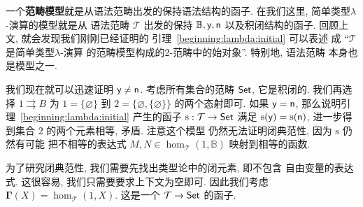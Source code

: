 一个\textbf{范畴模型}就是从语法范畴出发的保持语法结构的函子.
在我们这里, 简单类型\(\lambda\)-演算的模型就是从
语法范畴 \(\mathcal T\) 出发的保持
\(\mathbb B,\textsf{y},\textsf{n}\)
以及积闭结构的函子. 回顾上文, 就会发现我们刚刚已经证明的
引理~\ref{beginning:lambda:initial} 可以表述
成 “\(\mathcal T\) 是简单类型\(\lambda\)-演算
的范畴模型构成的2-范畴中的始对象”. 特别地, 语法范畴
本身也是模型之一.

我们现在就可以迅速证明 \(\textsf{y}\ne\textsf{n}\).
考虑所有集合的范畴 \(\textsf{Set}\), 它是积闭的.
我们再选择 \(1 \rightrightarrows B\) 为
\(1=\{\varnothing\}\) 到
\(2=\{\varnothing, \{\varnothing\}\}\) 的两个态射即可.
如果 \(\textsf{y}=\textsf{n}\),
那么说明引理~\ref{beginning:lambda:initial} 产生的函子
\(\mathrm s:\mathcal T \to \textsf{Set}\)
满足 \(\mathrm{s}(\textsf{y}) = \mathrm{s}(\textsf{n})\),
进一步得到集合 \(2\) 的两个元素相等, 矛盾. 注意这个模型
仍然无法证明闭典范性, 因为 \(\mathrm{s}\) 仍然有可能
把不相等的表达式 \(M,N \in
\hom_{\mathcal T}(1, \mathbb B)\)
映射到相等的函数.

为了研究闭典范性, 我们需要先找出类型论中的闭元素, 即不包含
自由变量的表达式. 这很容易, 我们只需要要求上下文为空即可.
因此我们考虑 \(\boldsymbol\Gamma(X) = \hom_{\mathcal T}(1, X)\).
这是一个 \(\mathcal T \to \textsf{Set}\) 的函子.

